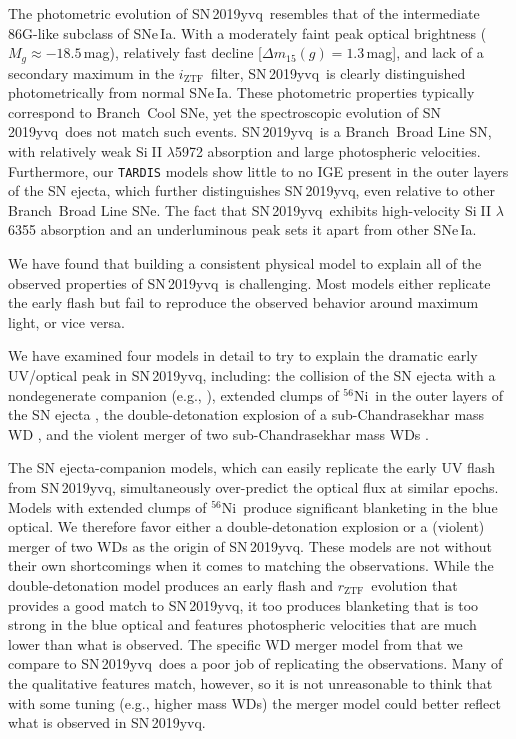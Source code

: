 \documentclass[twocolumn]{aastex63}
\def\ion#1#2{#1$\;${\footnotesize\rm{#2}}\relax}
\newcommand{\rztf}{$r_\mathrm{ZTF}$}
\newcommand{\iztf}{$i_\mathrm{ZTF}$}
\newcommand{\radni}{$^{56}$Ni}
\newcommand{\sn}{SN\,2019yvq}
\begin{document}
The photometric evolution of \sn\ resembles that of the intermediate 86G-like
subclass of SNe\,Ia. With a moderately faint peak optical brightness ($M_g
\approx -18.5$\,mag), relatively fast decline [$\Delta m_{15}(g) = 1.3$\,mag],
and lack of a secondary maximum in the \iztf\ filter, \sn\ is clearly
distinguished photometrically from normal SNe\,Ia. These photometric
properties typically correspond to Branch\ Cool SNe, yet the spectroscopic
evolution of \sn\ does not match such events. \sn\ is a Branch\ Broad Line SN,
with relatively weak \ion{Si}{II} $\lambda$5972 absorption and large
photospheric velocities. Furthermore, our \texttt{TARDIS} models show little
to no IGE present in the outer layers of the SN ejecta, which further
distinguishes \sn, even relative to other Branch~Broad Line SNe. The fact that
\sn\ exhibits high-velocity \ion{Si}{II} $\lambda$6355 absorption and an
underluminous peak sets it apart from other SNe\,Ia.

We have found that building a consistent physical model to explain all of the
observed properties of \sn\ is challenging. Most models either replicate the
early flash but fail to reproduce the observed behavior around maximum light,
or vice versa.

We have examined four models in detail to try to explain the dramatic early
UV/optical peak in \sn, including: the collision of the SN ejecta with a
nondegenerate companion (e.g., \citealt{Kasen10a}), extended clumps of \radni\
in the outer layers of the SN ejecta \citep[e.g.,][]{Magee20a}, the
double-detonation explosion of a sub-Chandrasekhar mass WD
\citep[e.g.,][]{Polin19}, and the violent merger of two sub-Chandrasekhar mass
WDs \citep[e.g.,][]{Kromer16}.

The SN ejecta-companion models, which can easily replicate the early UV flash
from \sn, simultaneously over-predict the optical flux at similar epochs.
Models with extended clumps of \radni\ produce significant blanketing in the
blue optical. We therefore favor either a double-detonation explosion or a
(violent) merger of two WDs as the origin of \sn. These models are not without
their own shortcomings when it comes to matching the observations. While the
double-detonation model produces an early flash and \rztf\ evolution that
provides a good match to \sn, it too produces blanketing that is too strong in
the blue optical and features photospheric velocities that are much lower than
what is observed. The specific WD merger model from \citet{Kromer16} that we
compare to \sn\ does a poor job of replicating the observations. Many of the
qualitative features match, however, so it is not unreasonable to think that
with some tuning (e.g., higher mass WDs) the merger model could better
reflect what is observed in \sn.
\end{document}
